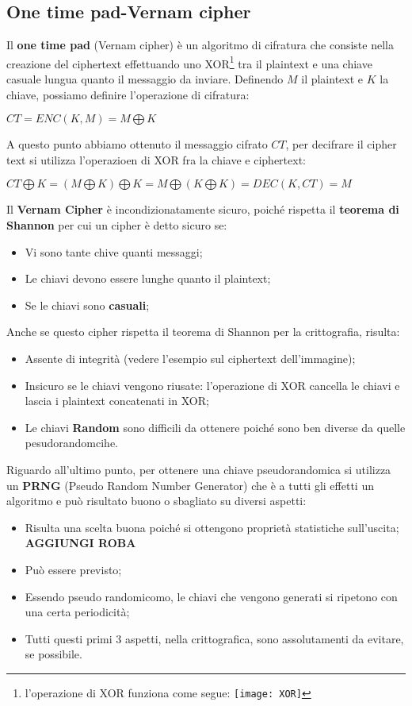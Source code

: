 \documentclass{article}
\theoremstyle{remark}
\begin{document}
\subsection{One time pad-Vernam cipher}
Il \textbf{one time pad} (Vernam cipher) è un algoritmo di cifratura che consiste nella creazione del ciphertext effettuando uno XOR\footnote{l'operazione di XOR funziona come segue: \texttt{[image: XOR]}
} tra il plaintext e una chiave casuale lungua quanto il messaggio da inviare. Definendo \(M\) il plaintext e \(K\) la chiave, possiamo definire l'operazione di cifratura:
\begin{center}
    \(CT=ENC(K,M)=M\bigoplus K\)
\end{center}
A questo punto abbiamo ottenuto il messaggio cifrato \(CT\), per decifrare il cipher text si utilizza l'operazioen di XOR fra la chiave e ciphertext:
\begin{center}
    \(CT\bigoplus K=(M\bigoplus K)\bigoplus K=M\bigoplus (K\bigoplus K)=DEC(K,CT)=M\)
\end{center}
Il \textbf{ Vernam Cipher} è incondizionatamente sicuro, poiché rispetta il \textbf{teorema di Shannon} per cui un cipher è detto sicuro se:
\begin{itemize}
    \item Vi sono tante chive quanti messaggi;
    \item Le chiavi devono essere lunghe quanto il plaintext;
    \item Se le chiavi sono \textbf{casuali};
\end{itemize}
Anche se questo cipher rispetta il teorema di Shannon per la crittografia, risulta:
\begin{itemize}
    \item Assente di integrità (vedere l'esempio sul ciphertext dell'immagine);
    \item Insicuro se le chiavi vengono riusate: l'operazione di XOR cancella le chiavi e lascia i plaintext concatenati in XOR\@;
    \item Le chiavi \textbf{Random} sono difficili da ottenere poiché sono ben diverse da quelle pesudorandomcihe.
\end{itemize}
Riguardo all'ultimo punto, per ottenere una chiave pseudorandomica si utilizza un \textbf{PRNG} (Pseudo Random Number Generator) che è a tutti gli effetti un algoritmo e può risultato buono o sbagliato su diversi aspetti:
\begin{itemize}
    \item Risulta una scelta buona poiché si ottengono proprietà statistiche sull'uscita;\newline
    \textbf{AGGIUNGI ROBA}
    \item Può essere previsto;
    \item Essendo pseudo randomicomo, le chiavi che vengono generati si ripetono con una certa periodicità;
    \item Tutti questi primi 3 aspetti, nella crittografica, sono assolutamenti da evitare, se possibile.
\end{itemize}
\end{document}
